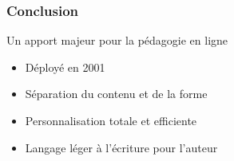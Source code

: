 \begin{frame}
	\frametitle{Conclusion}
	\begin{block}{Un apport majeur pour la pédagogie en ligne}
		\begin{itemize}
			\item Déployé en 2001
			\item Séparation du contenu et de la forme
			\item Personnalisation totale et efficiente
			\item Langage léger à l'écriture pour l'auteur
		\end{itemize}
	\end{block}
\end{frame}